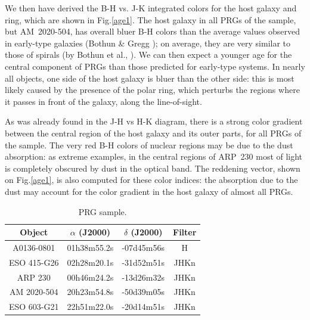 \documentclass{aa}
\begin{document}
We then have derived the B-H vs. J-K integrated colors for the 
host galaxy and ring, which are shown in Fig.\ref{age1}. The host galaxy
in all PRGs of the sample, but AM~2020-504, has
overall bluer B-H colors than the average values observed in early-type
galaxies (Bothun \& Gregg \cite{Bothun90}); 
on average, they are very similar to those of spirals (by Bothun et al., 
\cite{Bothun84}). 
We can then expect a younger age for the central component of PRGs
than those predicted for early-type systems.
In nearly all objects, one side of the host galaxy is bluer than the other
side: this is most likely caused by the presence of the polar ring, which
perturbs the regions where it passes in front of the galaxy, along the
line-of-sight.

As was already found in the J-H vs H-K diagram, there is
a strong color gradient between the central region of the host galaxy and its
outer parts, for all PRGs of the sample.  
The very red B-H colors of nuclear regions may be due to the dust absorption:
as extreme examples, in the central regions of ARP~230
most of light is completely obscured by dust in the optical band.
The reddening vector, shown on Fig.\ref{age1}, is also computed for these 
color indices: the absorption due to the dust may account for
the color gradient in the host galaxy of almost all PRGs. 


\begin{table}
\caption[]{PRG sample.}
\label{colcode}
\begin{tabular}{cccc}
\hline\hline
Object & $\alpha$ (J2000) & $\delta$ (J2000) & Filter\\
\hline
A0136-0801& 01h38m55.2s & -07d45m56s & H \\
ESO 415-G26 & 02h28m20.1s & -31d52m51s & JHKn \\
ARP 230 & 00h46m24.2s & -13d26m32s & JHKn \\
AM 2020-504& 20h23m54.8s & -50d39m05s & JHKn \\
ESO 603-G21& 22h51m22.0s & -20d14m51s & JHKn \\
\hline
\end{tabular}
\end{table}                                                                     
\end{document}
